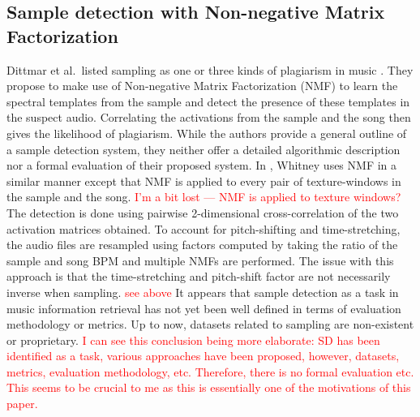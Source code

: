 \documentclass{article}
\begin{document}
\subsection{Sample detection with Non-negative Matrix Factorization}
%
Dittmar et al.\ listed sampling as one or three kinds of plagiarism in music \cite{dittmar2012audio}. They propose to make use of Non-negative Matrix Factorization (NMF) to learn the spectral templates from the sample and detect the presence of these templates in the suspect audio. Correlating the activations from the sample and the song then gives the likelihood of plagiarism. While the authors provide a general outline of a sample detection system, they neither offer a detailed algorithmic description nor a formal evaluation of their proposed system.
In \cite{whitney2013automatic}, Whitney uses NMF in a similar manner except that NMF is applied to every pair of texture-windows in the sample and the song. {\textcolor{red}{I'm a bit lost --- NMF is applied to texture windows?}} The detection is done using pairwise 2-dimensional cross-correlation of the two activation matrices obtained. To account for pitch-shifting and time-stretching, the audio files are resampled using factors computed by taking the ratio of the sample and song BPM and multiple NMFs are performed. %
The issue with this approach is that the time-stretching and pitch-shift factor are not necessarily inverse when sampling. {\textcolor{red}{see above}}
%
It appears that sample detection as a task in music information retrieval has not yet been well defined in terms of evaluation methodology or metrics. Up to now, datasets related to sampling are non-existent or proprietary. {\textcolor{red}{I can see this conclusion being more elaborate: SD has been identified as a task, various approaches have been proposed, however, datasets, metrics, evaluation methodology, etc. Therefore, there is no formal evaluation etc. This seems to be crucial to me as this is essentially one of the motivations of this paper.}}
\end{document}
